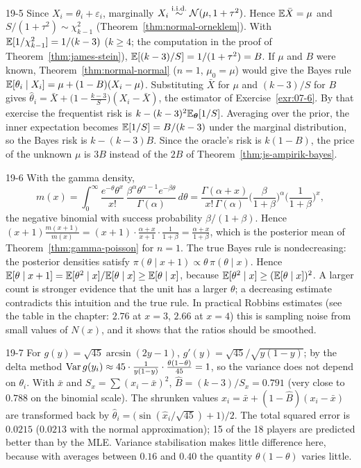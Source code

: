 \begin{solution}{19-5}
Since $X_i=\theta_i+\varepsilon_i$, marginally $X_i\overset{\text{i.i.d.}}{\sim}\mathcal{N}(\mu,1+\tau^2)$. Hence $\mathbb{E}\bar X=\mu$ and $S/(1+\tau^2)\sim\chi^2_{k-1}$ (Theorem~\ref{thm:normal-orneklem}). With $\mathbb{E}[1/\chi^2_{k-1}]=1/(k-3)$ ($k\ge4$; the computation in the proof of Theorem~\ref{thm:james-stein}), $\mathbb{E}[(k-3)/S]=1/(1+\tau^2)=B$. If $\mu$ and $B$ were known, Theorem~\ref{thm:normal-normal} ($n=1$, $\mu_0=\mu$) would give the Bayes rule $\mathbb{E}[\theta_i\mid X_i]=\mu+(1-B)(X_i-\mu)$. Substituting $\bar X$ for $\mu$ and $(k-3)/S$ for $B$ gives $\hat\theta_i=\bar X+\big(1-\frac{k-3}{S}\big)(X_i-\bar X)$, the estimator of Exercise~\ref{exr:07-6}. By that exercise the frequentist risk is $k-(k-3)^2\mathbb{E}_{\bm\theta}[1/S]$. Averaging over the prior, the inner expectation becomes $\mathbb{E}[1/S]=B/(k-3)$ under the marginal distribution, so the Bayes risk is $k-(k-3)B$. Since the oracle's risk is $k(1-B)$, the price of the unknown $\mu$ is $3B$ instead of the $2B$ of Theorem~\ref{thm:js-ampirik-bayes}.
\end{solution}

\begin{solution}{19-6}
With the gamma density,
\[
m(x)=\int_0^\infty\frac{e^{-\theta}\theta^x}{x!}\,\frac{\beta^\alpha\theta^{\alpha-1}e^{-\beta\theta}}{\Gamma(\alpha)}\,d\theta=\frac{\Gamma(\alpha+x)}{x!\,\Gamma(\alpha)}\Big(\frac{\beta}{1+\beta}\Big)^\alpha\Big(\frac{1}{1+\beta}\Big)^x,
\]
the negative binomial with success probability $\beta/(1+\beta)$. Hence $(x+1)\frac{m(x+1)}{m(x)}=(x+1)\cdot\frac{\alpha+x}{x+1}\cdot\frac1{1+\beta}=\frac{\alpha+x}{1+\beta}$, which is the posterior mean of Theorem~\ref{thm:gamma-poisson} for $n=1$.
The true Bayes rule is nondecreasing: the posterior densities satisfy $\pi(\theta\mid x+1)\propto\theta\,\pi(\theta\mid x)$. Hence $\mathbb{E}[\theta\mid x+1]=\mathbb{E}[\theta^2\mid x]/\mathbb{E}[\theta\mid x]\ge\mathbb{E}[\theta\mid x]$, because $\mathbb{E}[\theta^2\mid x]\ge(\mathbb{E}[\theta\mid x])^2$. A larger count is stronger evidence that the unit has a larger $\theta$; a decreasing estimate contradicts this intuition and the true rule. In practical Robbins estimates (see the table in the chapter: $2.76$ at $x=3$, $2.66$ at $x=4$) this is sampling noise from small values of $N(x)$, and it shows that the ratios should be smoothed.
\end{solution}

\begin{solution}{19-7}
For $g(y)=\sqrt{45}\arcsin(2y-1)$, $g'(y)=\sqrt{45}/\sqrt{y(1-y)}$; by the delta method $\operatorname{Var} g(y_i)\approx45\cdot\frac{1}{y(1-y)}\cdot\frac{\theta(1-\theta)}{45}=1$, so the variance does not depend on $\theta_i$. With $\bar x$ and $S_x=\sum(x_i-\bar x)^2$, $\hat B=(k-3)/S_x=0.791$ (very close to $0.788$ on the binomial scale). The shrunken values $\hat x_i=\bar x+(1-\hat B)(x_i-\bar x)$ are transformed back by $\hat\theta_i=\big(\sin(\hat x_i/\sqrt{45})+1\big)/2$. The total squared error is $0.0215$ ($0.0213$ with the normal approximation); 15 of the 18 players are predicted better than by the MLE. Variance stabilisation makes little difference here, because with averages between $0.16$ and $0.40$ the quantity $\theta(1-\theta)$ varies little.
\end{solution}
